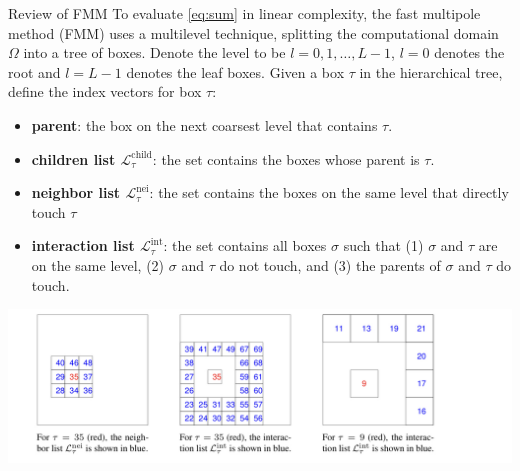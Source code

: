 \documentclass[hangout,aspectratio=1610,10pt]{beamer}
\newcommand{\Lchild}{\mathcal{L}^{\text{child}}}
\newcommand{\Lnei}{\mathcal{L}^{\text{nei}}}
\newcommand{\Lint}{\mathcal{L}^{\text{int}}}
\begin{document}
\begin{frame}{Review of FMM}
To evaluate \eqref{eq:sum} in linear complexity, the fast multipole method (FMM) uses a multilevel technique, splitting the computational domain $\Omega$ into a tree of boxes. Denote the level to be $l=0,1,\ldots,L-1$, $l=0$ denotes the root and $l=L-1$ denotes the leaf boxes. Given a box $\tau$ in the hierarchical tree, define the index vectors for box $\tau$:
\begin{itemize}
    \item \textbf{parent}: the box on the next coarsest level that contains $\tau$.
    \item \textbf{children list $\Lchild_\tau$}: the set contains the boxes whose parent is $\tau$.
\item \textbf{neighbor list $\Lnei_\tau$}: the set contains the boxes on the same level that directly touch $\tau$ 
\item \textbf{interaction list $\Lint_\tau$}: the set contains all boxes $\sigma$ such that (1) $\sigma$ and $\tau$ are on the same level, (2) $\sigma$ and $\tau$ do not touch, and (3) the parents of $\sigma$ and $\tau$ do touch.
\end{itemize}
\begin{center}
    \includegraphics[width=1.\linewidth]{plots/list.jpeg}
\end{center}

\end{frame}
\end{document}
